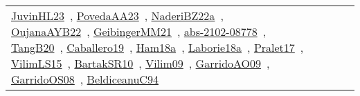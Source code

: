 {\begin{longtable}{lp{3cm}>{\raggedright\arraybackslash}p{6cm}>{\raggedright\arraybackslash}p{6cm}>{\raggedright\arraybackslash}p{8cm}}
\href{../works/JuvinHL23.pdf}{JuvinHL23}~\cite{JuvinHL23}, \href{../works/PovedaAA23.pdf}{PovedaAA23}~\cite{PovedaAA23}, \href{../works/NaderiBZ22a.pdf}{NaderiBZ22a}~\cite{NaderiBZ22a}, \href{../works/OujanaAYB22.pdf}{OujanaAYB22}~\cite{OujanaAYB22}, \href{../works/GeibingerMM21.pdf}{GeibingerMM21}~\cite{GeibingerMM21}, \href{../works/abs-2102-08778.pdf}{abs-2102-08778}~\cite{abs-2102-08778}, \href{../works/TangB20.pdf}{TangB20}~\cite{TangB20}, \href{../works/Caballero19.pdf}{Caballero19}~\cite{Caballero19}, \href{../works/Ham18a.pdf}{Ham18a}~\cite{Ham18a}, \href{../works/Laborie18a.pdf}{Laborie18a}~\cite{Laborie18a}, \href{../works/Pralet17.pdf}{Pralet17}~\cite{Pralet17}, \href{../works/VilimLS15.pdf}{VilimLS15}~\cite{VilimLS15}, \href{../works/BartakSR10.pdf}{BartakSR10}~\cite{BartakSR10}, \href{../works/Vilim09.pdf}{Vilim09}~\cite{Vilim09}, \href{../works/GarridoAO09.pdf}{GarridoAO09}~\cite{GarridoAO09}, \href{../works/GarridoOS08.pdf}{GarridoOS08}~\cite{GarridoOS08}, \href{../works/BeldiceanuC94.pdf}{BeldiceanuC94}~\cite{BeldiceanuC94}\\

\end{longtable}}
